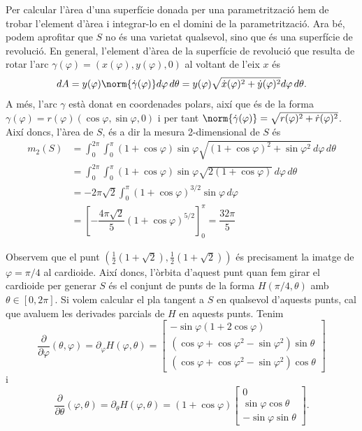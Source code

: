 Per calcular l'àrea d'una superfície donada per una parametrització hem de trobar l'element d'àrea i integrar-lo en el domini de la parametrització. Ara bé, podem aprofitar que \( S \) no és una varietat qualsevol, sino que és una superfície de revolució. En general, l'element d'àrea de la superfície de revolució que resulta de rotar l'arc \( \gamma(\varphi) = (x(\varphi), y(\varphi), 0) \) al voltant de l'eix \( x \) és 
\begin{equation}
  dA = y(\varphi)\norm{\dot{\gamma}(\varphi)} d\varphi \, d\theta = y(\varphi)\sqrt{\dot{x}(\varphi)^2 + \dot{y}(\varphi)^2} d\varphi \, d\theta. 
\end{equation}
A més, l'arc \( \gamma \) està donat en coordenades polars, així que és de la forma \( \gamma(\varphi) = r(\varphi) (\cos{\varphi}, \sin{\varphi}, 0) \) i per tant \( \norm{\dot{\gamma}(\varphi)} = \sqrt{r(\varphi)^2 + \dot{r}(\varphi)^2} \). Així doncs, l'àrea de \( S \), és a dir la mesura 2-dimensional de \( S \) és
\begin{align*}
 	m_2(S) &= \int_0^{2\pi} \! \int_0^\pi (1+\cos{\varphi})\sin{\varphi} \sqrt{(1+\cos{\varphi})^2 + \sin{\varphi}^2} \, d\varphi \, d\theta \\	
				 &= \int_0^{2\pi} \! \int_0^\pi (1+\cos{\varphi})\sin{\varphi} \sqrt{2(1 + \cos{\varphi})} \, d\varphi \, d\theta \\
				 &= -2\pi\sqrt{2} \int_0^\pi (1 + \cos{\varphi})^{3/2} \sin{\varphi} \, d\varphi \\ 
				 &= \left[-\dfrac{4\pi\sqrt{2}}{5} (1 + \cos{\varphi})^{5/2}\right]_0^\pi = \dfrac{32\pi}{5} 
\end{align*}

Observem que el punt \( \left(\frac{1}{2}(1+\sqrt{2}),\frac{1}{2}(1+\sqrt{2})\right) \) és precisament la imatge de \( \varphi = \pi/4 \) al cardioide. Així doncs, l'òrbita d'aquest punt quan fem girar el cardioide per generar \( S \) és el conjunt de punts de la forma \( H(\pi/4, \theta) \) amb \( \theta \in [0, 2\pi] \). Si volem calcular el pla tangent a \( S \) en qualsevol d'aquests punts, cal que avaluem les derivades parcials de \( H \) en aquests punts. Tenim
\begin{equation}
	\dfrac{\partial}{\partial \varphi}(\theta,\varphi) = \partial_{\varphi}H(\varphi, \theta) = \begin{bmatrix}
    -\sin{\varphi}(1 + 2\cos{\varphi}) \\
    (\cos{\varphi} + \cos{\varphi}^2 - \sin{\varphi}^2)\sin{\theta} \\
    (\cos{\varphi} + \cos{\varphi}^2 - \sin{\varphi}^2)\cos{\theta} 
  \end{bmatrix} \label{eq:parcial 1}
\end{equation}
i
\begin{equation}
	\dfrac{\partial}{\partial \theta}(\varphi, \theta) = \partial_{\theta}H(\varphi, \theta) = (1 + \cos{\varphi}) \begin{bmatrix}
    0 \\
    \sin{\varphi}\cos{\theta} \\
    -\sin{\varphi}\sin{\theta}
  \end{bmatrix} . \label{eq:parcial 2}
\end{equation}

